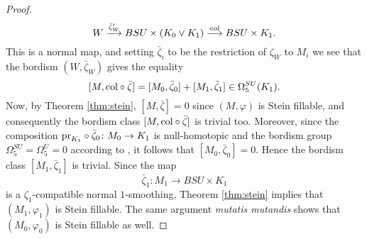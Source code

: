 \documentclass[12pt]{amsart}
\newcommand\acs{\varphi}  				%
\newcommand\scxs{\zeta}					%
\newcommand\bscxs{\bar \zeta}			%
\theoremstyle{remark}
\begin{document}
\begin{proof}
%
\[ W \stackrel{\bscxs'_{W}} \longrightarrow BSU \times (K_0 \vee K_1) \stackrel{{\rm col}} \longrightarrow BSU \times K_1.\]
%
This is a normal map, and setting $\bscxs_i$ to be the restriction of $\zeta_W$ to $M_i$ we see that the bordism
$(W, \bscxs_W)$ gives the equality
%
\[ [M, {\rm col} \circ \bscxs] = [M_0, \bscxs_0] + [M_1, \bscxs_1] \in \Omega_5^{SU}(K_1).\]
%
Now, by Theorem \ref{thm:stein}, $[M, \bscxs] = 0$ since $(M, \acs)$ is Stein fillable, and
consequently the bordism class $[M, {\rm col} \circ \bscxs]$ is trivial too.  Moreover, since
the composition ${\rm pr}_{K_1} \circ \bscxs_0 \colon M_0 \to K_1$ is null-homotopic and the bordism group $\Omega^{SU}_5 = \Omega_5^{U} = 0$ according to \cite[p.\,248]{Stong1}, it follows that $[M_0, \bscxs_0] = 0$. 
Hence the bordism class $[M_1, \bscxs_1]$ is trivial. Since the map
$$\bscxs_1 \colon M_1 \to BSU \times K_1$$
 is a 
$\scxs_1$-compatible normal $1$-smoothing, Theorem \ref{thm:stein} implies that $(M_1, \acs_1)$ is Stein fillable. The same argument \emph{mutatis mutandis} shows that
 $(M_0, \acs_0)$ is Stein fillable as well.
\end{proof}
\end{document}
